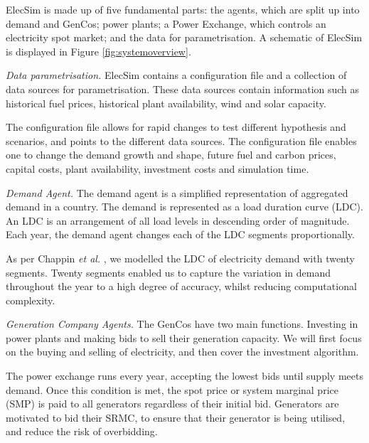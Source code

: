 ElecSim is made up of five fundamental parts: the agents, which are split up into demand and GenCos; power plants; a Power Exchange, which controls an electricity spot market; and the data for parametrisation. A schematic of ElecSim is displayed in Figure \ref{fig:systemoverview}.

\textit{Data parametrisation.} ElecSim contains a configuration file and a collection of data sources for parametrisation. These data sources contain information such as historical fuel prices, historical plant availability, wind and solar capacity.

The configuration file allows for rapid changes to test different hypothesis and scenarios, and points to the different data sources. The configuration file enables one to change the demand growth and shape, future fuel and carbon prices, capital costs, plant availability, investment costs and simulation time.

\textit{Demand Agent.} The demand agent is a simplified representation of aggregated demand in a country. The demand is represented as a load duration curve (LDC).  An LDC is an arrangement of all load levels in descending order of magnitude.  Each year, the demand agent changes each of the LDC segments proportionally.


As per Chappin \textit{et al.} \cite{Chappin2017}, we modelled the LDC of electricity demand with twenty segments. Twenty segments enabled us to capture the variation in demand throughout the year to a high degree of accuracy, whilst reducing computational complexity. 


\textit{Generation Company Agents.} The GenCos have two main functions. Investing in power plants and making bids to sell their generation capacity. We will first focus on the buying and selling of electricity, and then cover the investment algorithm.

The power exchange runs every year, accepting the lowest bids until supply meets demand. Once this condition is met, the spot price or system marginal price (SMP) is paid to all generators regardless of their initial bid. Generators are motivated to bid their SRMC, to ensure that their generator is being utilised, and reduce the risk of overbidding.

